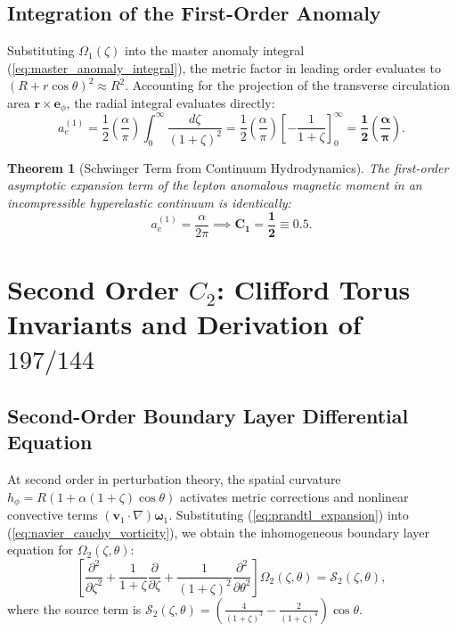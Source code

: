 \documentclass[12pt,a4paper]{article}
\newtheorem{theorem}{Theorem}
\begin{document}
	\subsection{Integration of the First-Order Anomaly}
	Substituting $\Omega_1(\zeta)$ into the master anomaly integral (\ref{eq:master_anomaly_integral}), the metric factor in leading order evaluates to $(R + r\cos\theta)^2 \approx R^2$. Accounting for the projection of the transverse circulation area $\mathbf{r} \times \mathbf{e}_\phi$, the radial integral evaluates directly:
	\begin{equation}
		a_e^{(1)} = \frac{1}{2} \left(\frac{\alpha}{\pi}\right) \int_0^\infty \frac{d\zeta}{(1+\zeta)^2} = \frac{1}{2} \left(\frac{\alpha}{\pi}\right) \left[ -\frac{1}{1+\zeta} \right]_0^\infty = \mathbf{\frac{1}{2} \left(\frac{\alpha}{\pi}\right)}.
	\end{equation}
	
	\begin{theorem}[Schwinger Term from Continuum Hydrodynamics]
		The first-order asymptotic expansion term of the lepton anomalous magnetic moment in an incompressible hyperelastic continuum is identically:
		\begin{equation}
			a_e^{(1)} = \frac{\alpha}{2\pi} \implies \mathbf{C_1 = \frac{1}{2} \equiv 0.5}.
		\end{equation}
	\end{theorem}
	
	\section{Second Order $C_2$: Clifford Torus Invariants and Derivation of $197/144$}
	
	\subsection{Second-Order Boundary Layer Differential Equation}
	At second order in perturbation theory, the spatial curvature $h_\phi = R(1 + \alpha(1+\zeta)\cos\theta)$ activates metric corrections and nonlinear convective terms $(\mathbf{v}_1 \cdot \nabla)\boldsymbol{\omega}_1$. Substituting (\ref{eq:prandtl_expansion}) into (\ref{eq:navier_cauchy_vorticity}), we obtain the inhomogeneous boundary layer equation for $\Omega_2(\zeta, \theta)$:
	\begin{equation}
		\left[ \frac{\partial^2}{\partial \zeta^2} + \frac{1}{1+\zeta}\frac{\partial}{\partial \zeta} + \frac{1}{(1+\zeta)^2}\frac{\partial^2}{\partial \theta^2} \right] \Omega_2(\zeta, \theta) = \mathcal{S}_2(\zeta, \theta),
		\label{eq:second_order_pde}
	\end{equation}
	where the source term is $\mathcal{S}_2(\zeta, \theta) = \left( \frac{4}{(1+\zeta)^3} - \frac{2}{(1+\zeta)^4} \right) \cos\theta$.
	
\end{document}
